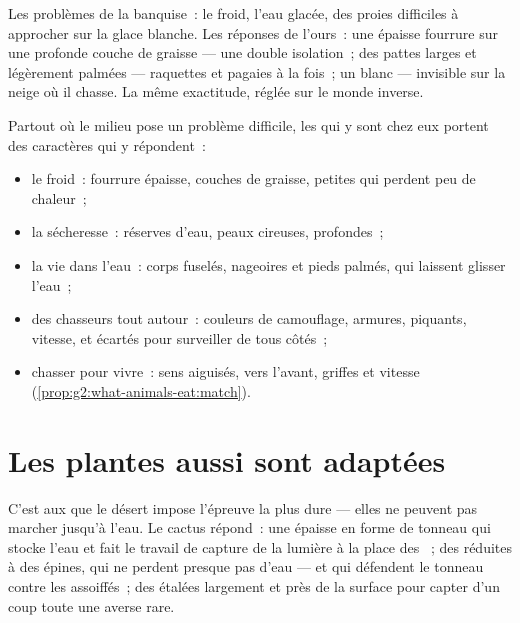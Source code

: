 \begin{example}\label{ex:g4:adapted-to-their-world:bear}
Les problèmes de la banquise~: le froid, l'eau glacée, des proies
difficiles à approcher sur la glace blanche. Les réponses de
l'ours~: une épaisse fourrure sur une profonde couche de graisse ---
une double isolation~; des pattes larges et légèrement palmées ---
raquettes et pagaies à la fois~; un  blanc --- invisible sur
la neige où il chasse. La même exactitude, réglée sur le monde
inverse.
\end{example}

\begin{proposition}\label{prop:g4:adapted-to-their-world:answers}
Partout où le milieu pose un problème difficile, les 
qui y sont chez eux portent des caractères qui y répondent~:
\begin{itemize}
  \item le froid~: fourrure épaisse, couches de graisse, petites
         qui perdent peu de chaleur~;
  \item la sécheresse~: réserves d'eau, peaux cireuses, 
        profondes~;
  \item la vie dans l'eau~: corps fuselés, nageoires et pieds
        palmés,  qui laissent glisser l'eau~;
  \item des chasseurs tout autour~: couleurs de camouflage,
        armures, piquants, vitesse, et  écartés pour surveiller
        de tous côtés~;
  \item chasser pour vivre~: sens aiguisés,  vers l'avant,
        griffes et vitesse
        (\cref{prop:g2:what-animals-eat:match}).
\end{itemize}
\end{proposition}
\admitted

\section{Les plantes aussi sont adaptées}

\begin{example}[Le cactus]\label{ex:g4:adapted-to-their-world:cactus}
C'est aux  que le désert impose l'épreuve la plus dure ---
elles ne peuvent pas marcher jusqu'à l'eau. Le cactus répond~: une
 épaisse en forme de tonneau qui stocke l'eau et fait le travail
de capture de la lumière à la place des ~; des 
réduites à des épines, qui ne perdent presque pas d'eau --- et qui
défendent le tonneau contre les  assoiffés~; des 
étalées largement et près de la surface pour capter d'un coup toute
une averse rare.
\end{example}


